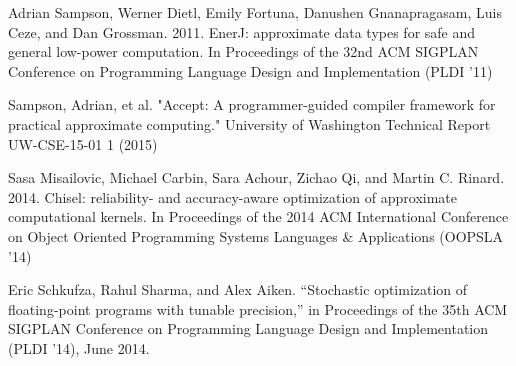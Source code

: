 \documentclass[12pt,conference]{IEEEtran}
\begin{document}
\begin{thebibliography}{11}
Adrian Sampson, Werner Dietl, Emily Fortuna, Danushen Gnanapragasam, Luis Ceze, and Dan Grossman. 2011. EnerJ: approximate data types for safe and general low-power computation. In Proceedings of the 32nd ACM SIGPLAN Conference on Programming Language Design and Implementation (PLDI '11)

Sampson, Adrian, et al. "Accept: A programmer-guided compiler framework for practical approximate computing." University of Washington Technical Report UW-CSE-15-01 1 (2015)

Sasa Misailovic, Michael Carbin, Sara Achour, Zichao Qi, and Martin C. Rinard. 2014. Chisel: reliability- and accuracy-aware optimization of approximate computational kernels. In Proceedings of the 2014 ACM International Conference on Object Oriented Programming Systems Languages \& Applications (OOPSLA '14) 

Eric Schkufza, Rahul Sharma, and Alex Aiken. “Stochastic optimization of floating-point
programs with tunable precision,” in Proceedings of the 35th ACM SIGPLAN Conference on
Programming Language Design and Implementation (PLDI ’14), June 2014.

\end{thebibliography}
\end{document}
